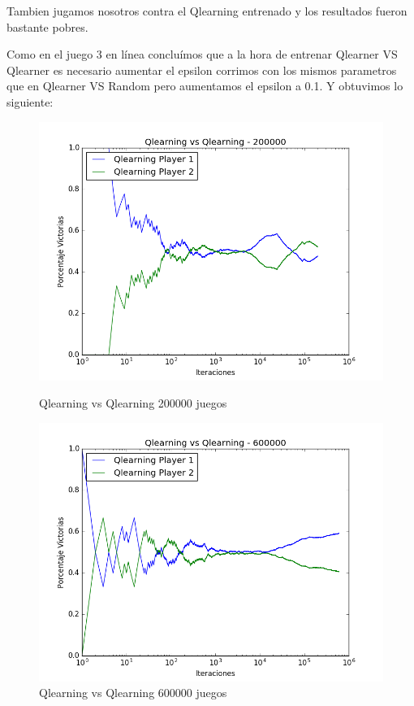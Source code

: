 Tambien jugamos nosotros contra el Qlearning entrenado y los resultados fueron bastante pobres. 

Como en el juego 3 en línea concluímos que a la hora de entrenar Qlearner VS Qlearner es necesario aumentar el epsilon corrimos con los mismos parametros que en Qlearner VS Random pero aumentamos el epsilon a 0.1. Y obtuvimos lo siguiente:

\begin{figure}[h]
 \centering
 \begin{minipage}{.45\textwidth}
	\centering
	\includegraphics[scale=0.35]{resultados/7x6/QlearningVsQlearning_200000_7x6_parametros_informe.png}
       \caption{Qlearning vs Qlearning 200000 juegos}
  \end{minipage}
 \begin{minipage}{.5\textwidth}
	\centering
	\includegraphics[scale=0.35]{resultados/7x6/QlearningVsQlearning_600000_7x6_parametros_informe.png}
        \caption{Qlearning vs Qlearning 600000 juegos}
  \end{minipage}
\end{figure}

